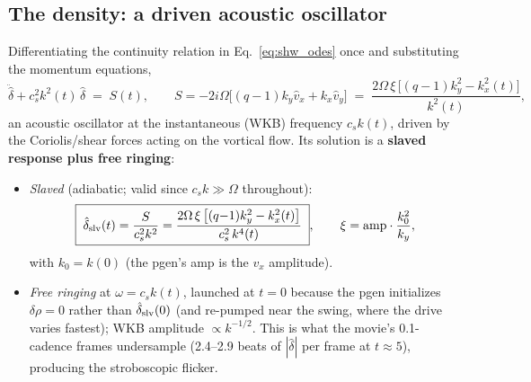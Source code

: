 \documentclass[11pt]{article}
\begin{document}
\subsection{The density: a driven acoustic oscillator}
Differentiating the continuity relation in Eq.~\eqref{eq:shw_odes} once and
substituting the momentum equations,
\begin{equation}
\ddot{\hat\delta} + c_s^2 k^2(t)\,\hat\delta \;=\; S(t),
\qquad
S = -2i\Omega\big[(q{-}1)k_y\hat v_x + k_x\hat v_y\big]
  \;=\; \frac{2\Omega\,\xi\,\big[(q{-}1)k_y^2 - k_x^2(t)\big]}{k^2(t)} ,
\label{eq:oscillator}
\end{equation}
an acoustic oscillator at the instantaneous (WKB) frequency $c_sk(t)$, driven by
the Coriolis/shear forces acting on the vortical flow. Its solution is a
\textbf{slaved response plus free ringing}:
\begin{itemize}
\item \emph{Slaved} (adiabatic; valid since $c_sk \gg \Omega$ throughout):
\begin{equation}
\boxed{\;
\hat\delta_{\rm slv}(t) = \frac{S}{c_s^2k^2}
= \frac{2\Omega\,\xi\,\big[(q{-}1)k_y^2 - k_x^2(t)\big]}{c_s^2\,k^4(t)}\;},
\qquad
\xi = \mathrm{amp}\cdot\frac{k_0^2}{k_y},
\label{eq:slaved}
\end{equation}
with $k_0 = k(0)$ (the pgen's amp is the $v_x$ amplitude).
\item \emph{Free ringing} at $\omega = c_sk(t)$, launched at $t=0$ because the
pgen initializes $\delta\rho = 0$ rather than $\hat\delta_{\rm slv}(0)$ (and
re-pumped near the swing, where the drive varies fastest); WKB amplitude
$\propto k^{-1/2}$. This is what the movie's 0.1-cadence frames undersample
(2.4--2.9 beats of $|\hat\delta|$ per frame at $t \approx 5$), producing the
stroboscopic flicker.
\end{itemize}
\end{document}
